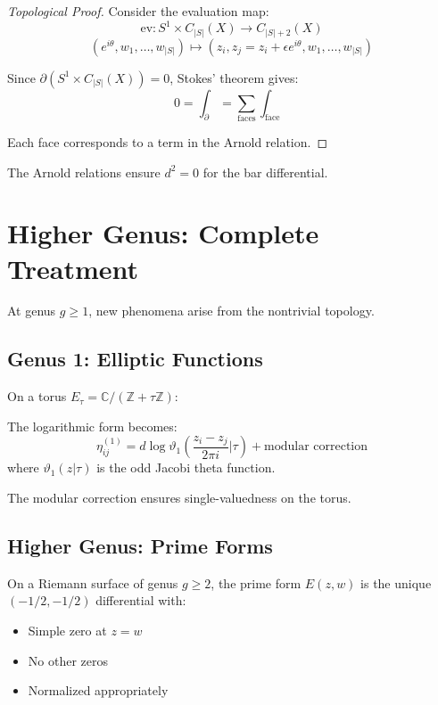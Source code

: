 \begin{proof}[Topological Proof]
Consider the evaluation map:
$$\text{ev}: S^1 \times C_{|S|}(X) \to C_{|S|+2}(X)$$
$$(e^{i\theta}, w_1, \ldots, w_{|S|}) \mapsto (z_i, z_j = z_i + \epsilon e^{i\theta}, w_1, \ldots, w_{|S|})$$

Since $\partial(S^1 \times C_{|S|}(X)) = 0$, Stokes' theorem gives:
$$0 = \int_{\partial} = \sum_{\text{faces}} \int_{\text{face}}$$

Each face corresponds to a term in the Arnold relation.
\end{proof}

\begin{corollary}
The Arnold relations ensure $d^2 = 0$ for the bar differential.
\end{corollary}

\section{Higher Genus: Complete Treatment}

At genus $g \geq 1$, new phenomena arise from the nontrivial topology.

\subsection{Genus 1: Elliptic Functions}

On a torus $E_\tau = \mathbb{C}/(\mathbb{Z} + \tau\mathbb{Z})$:

\begin{theorem}
The logarithmic form becomes:
$$\eta_{ij}^{(1)} = d\log\vartheta_1\left(\frac{z_i - z_j}{2\pi i}\Big|\tau\right) + \text{modular correction}$$
where $\vartheta_1(z|\tau)$ is the odd Jacobi theta function.
\end{theorem}

The modular correction ensures single-valuedness on the torus.

\subsection{Higher Genus: Prime Forms}

\begin{definition}
On a Riemann surface of genus $g \geq 2$, the prime form $E(z,w)$ is the unique $(-1/2, -1/2)$ differential with:
\begin{itemize}
\item Simple zero at $z = w$
\item No other zeros
\item Normalized appropriately
\end{itemize}
\end{definition}

